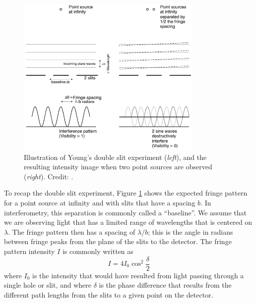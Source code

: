 \documentclass[11pt]{article}
\begin{document}
\begin{figure}[h]
    \centering
    \includegraphics[width=0.8\textwidth]{doc/youngs.png}
    \caption{Illustration of Young's double slit experiment (\emph{left}), and the resulting intensity image when two point sources are observed (\emph{right}). Credit: \citet{2003RPPh...66..789M}.}
    \label{fig:youngs}
\end{figure}

To recap the double slit experiment, Figure \ref{fig:youngs} shows the expected fringe pattern for a point source at infinity and with slits that have a spacing $b$. In interferometry, this separation is commonly called a ``baseline''. We assume that we are observing light that has a limited range of wavelengths that is centered on $\lambda$. The fringe pattern then has a spacing of $\lambda/b$; this is the angle in radians between fringe peaks from the plane of the slits to the detector. The fringe pattern intensity $I$ is commonly written as
\begin{equation}\label{eq:fringepattern}
    I = 4 I_0 \cos^2 \frac{\delta}{2}
\end{equation}
where $I_0$ is the intensity that would have resulted from light passing through a single hole or slit, and where $\delta$ is the phase difference that results from the different path lengths from the slits to a given point on the detector.
\end{document}
